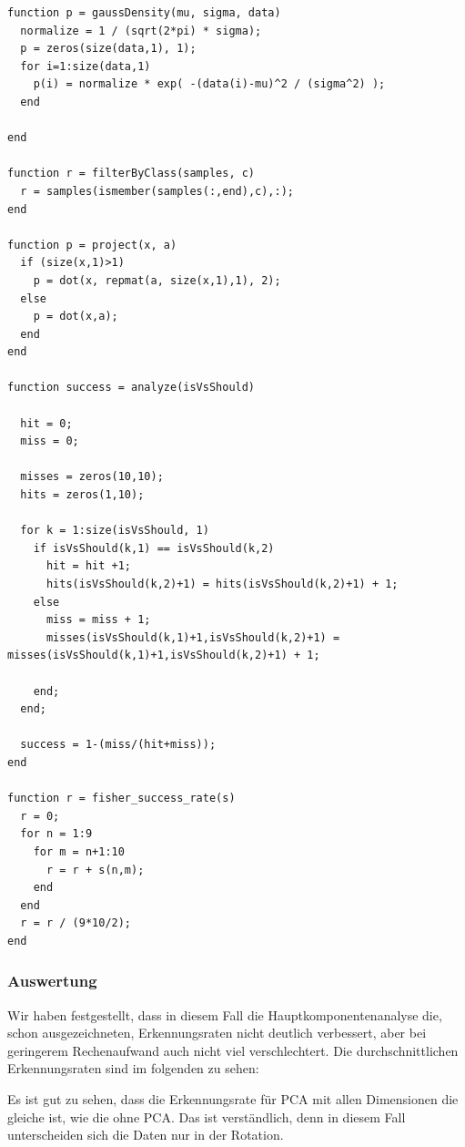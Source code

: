 \documentclass{article}
\begin{document}
\begin{lstlisting} 
function p = gaussDensity(mu, sigma, data)
  normalize = 1 / (sqrt(2*pi) * sigma);
  p = zeros(size(data,1), 1);
  for i=1:size(data,1)
    p(i) = normalize * exp( -(data(i)-mu)^2 / (sigma^2) );
  end

end

function r = filterByClass(samples, c)
  r = samples(ismember(samples(:,end),c),:);
end

function p = project(x, a)
  if (size(x,1)>1)
    p = dot(x, repmat(a, size(x,1),1), 2);
  else
    p = dot(x,a);
  end
end

function success = analyze(isVsShould)

  hit = 0;
  miss = 0;

  misses = zeros(10,10);
  hits = zeros(1,10);

  for k = 1:size(isVsShould, 1)
    if isVsShould(k,1) == isVsShould(k,2)
      hit = hit +1;
      hits(isVsShould(k,2)+1) = hits(isVsShould(k,2)+1) + 1;
    else
      miss = miss + 1;
      misses(isVsShould(k,1)+1,isVsShould(k,2)+1) = misses(isVsShould(k,1)+1,isVsShould(k,2)+1) + 1;

    end;
  end;

  success = 1-(miss/(hit+miss));
end

function r = fisher_success_rate(s)
  r = 0;
  for n = 1:9
    for m = n+1:10
      r = r + s(n,m);
    end
  end
  r = r / (9*10/2);
end
\end{lstlisting} 
\subsubsection*{Auswertung}
Wir haben festgestellt, dass in diesem Fall die
Hauptkomponentenanalyse die, schon ausgezeichneten, Erkennungsraten
nicht deutlich verbessert, aber bei geringerem Rechenaufwand auch nicht
viel verschlechtert. Die durchschnittlichen Erkennungsraten sind im
folgenden zu sehen:
\begin{samepage}

\end{samepage}
Es ist gut zu sehen, dass die Erkennungsrate für PCA mit allen
Dimensionen die gleiche ist, wie die ohne PCA. Das ist verständlich,
denn in diesem Fall unterscheiden sich die Daten nur in der Rotation.
\end{document}
